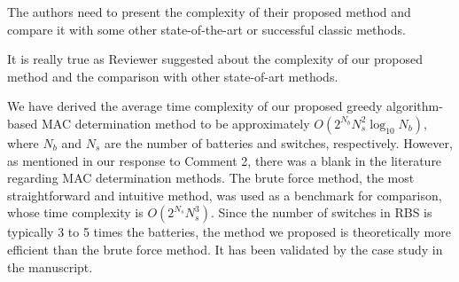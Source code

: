 \begin{revcomment}
  The authors need to present the complexity of their proposed method and compare it with some other state-of-the-art or successful classic methods.
\end{revcomment}
\begin{revresponse}

It is really true as Reviewer suggested about the complexity of our proposed method and the comparison with other state-of-art methods.


We have derived the average time complexity of our proposed greedy algorithm-based MAC determination method to be approximately $O(2^{N_b}N_s^2\log_{10} N_b)$, where $N_b$ and $N_s$ are the number of batteries and switches, respectively.
However, as mentioned in our response to Comment 2, there was a blank in the literature regarding MAC determination methods.
The brute force method, the most straightforward and intuitive method, was used as a benchmark for comparison, whose time complexity is $O(2^{N_s}N_s^3)$.
Since the number of switches in RBS is typically 3 to 5 times the batteries\cite{ciNovelDesignAdaptive2007,alahmadBatterySwitchArray2008,kimDependableEfficientScalable2010b,kimBalancedReconfigurationStorage2011a,taesickimSeriesconnectedSelfreconfigurableMulticell2012a,6843711}, the method we proposed is theoretically more efficient than the brute force method.
It has been validated by the case study in the manuscript.



\end{revresponse}
